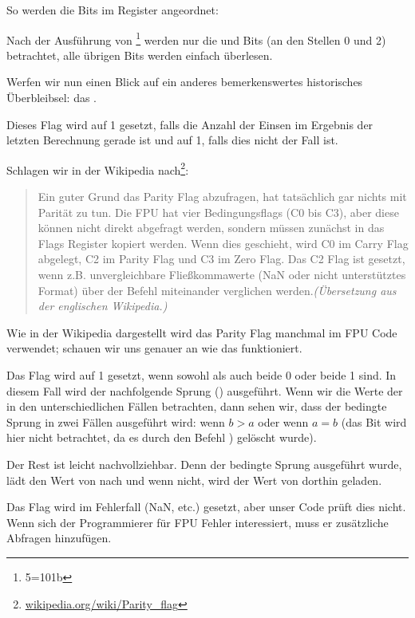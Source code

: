 

So werden die \CThreeBits Bits im \AH Register angeordnet:


Nach der Ausführung von \footnote{5=101b} werden nur die \Czero
und \Ctwo Bits (an den Stellen 0 und 2) betrachtet, alle übrigen Bits werden
einfach überlesen.

\label{parity_flag}
Werfen wir nun einen Blick auf ein anderes bemerkenswertes historisches
Überbleibsel: das .

Dieses Flag wird auf 1 gesetzt, falls die Anzahl der Einsen im Ergebnis der
letzten Berechnung gerade ist und auf 1, falls dies nicht der Fall ist.

Schlagen wir in der Wikipedia
nach\footnote{\href{http://go.yurichev.com/17131}{wikipedia.org/wiki/Parity\_flag}}:

\begin{framed}
\begin{quotation}
Ein guter Grund das Parity Flag abzufragen, hat tatsächlich gar nichts mit
Parität zu tun. Die FPU hat vier Bedingungsflags (C0 bis C3), aber diese können
nicht direkt abgefragt werden, sondern müssen zunächst in das Flags Register
kopiert werden. Wenn dies geschieht, wird C0 im Carry Flag abgelegt, C2 im
Parity Flag und C3 im Zero Flag.
Das C2 Flag ist gesetzt, wenn z.B. unvergleichbare Fließkommawerte (NaN oder
nicht unterstütztes Format) über der \FUCOM Befehl miteinander verglichen
werden.\textit{(Übersetzung aus der englischen Wikipedia.)}
\end{quotation}
\end{framed}

Wie in der Wikipedia dargestellt wird das Parity Flag manchmal im FPU Code
verwendet; schauen wir uns genauer an wie das funktioniert.

Das \PF Flag wird auf 1 gesetzt, wenn sowohl \Czero als auch \Ctwo beide 0 oder
beide 1 sind. In diesem Fall wird der nachfolgende Sprung \JP() ausgeführt.
Wenn wir die Werte der \CThreeBits in den unterschiedlichen Fällen betrachten,
dann sehen wir, dass der bedingte Sprung \JP in zwei Fällen ausgeführt wird:
wenn $b>a$ oder wenn $a=b$ (das \Cthree Bit wird hier nicht betrachtet, da es
durch den Befehl ) gelöscht wurde).

Der Rest ist leicht nachvollziehbar.
Denn der bedingte Sprung ausgeführt wurde, lädt \FLD den Wert von  nach
 und wenn nicht, wird der Wert von  dorthin geladen.

Das \Ctwo Flag wird im Fehlerfall (\gls{NaN}, etc.) gesetzt, aber unser Code
prüft dies nicht. 
Wenn sich der Programmierer für FPU Fehler interessiert, muss er zusätzliche
Abfragen hinzufügen.


